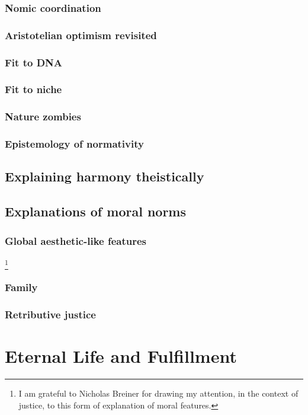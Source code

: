 \subsection{Nomic coordination}
\subsection{Aristotelian optimism revisited}
\subsection{Fit to DNA}
\subsection{Fit to niche}
\subsection{Nature zombies}
\subsection{Epistemology of normativity}
\section{Explaining harmony theistically}
\section{Explanations of moral norms}
\subsection{Global aesthetic-like features}\footnote{I am grateful to Nicholas Breiner for drawing my attention, in the context of
justice, to this form of explanation of moral features.}
\subsection{Family}
\subsection{Retributive justice}
\chaptertail

\def\mychapter{X}

\chapter{Eternal Life and Fulfillment}\label{ch:eternal-life}
\chaptertail

